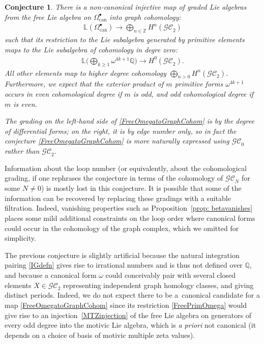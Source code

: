 \documentclass[pdftex]{sigma}%
\newtheorem{conj}[thm]{Conjecture}
{\theoremstyle{definition}
\newtheorem{defn}[thm]{Definition}
\newtheorem{Example}[thm]{Example}
\newtheorem{rem}[thm]{Remark}
}
\numberwithin{equation}{section}
\newcommand{\To}{\longrightarrow}
\newcommand{\Z}{\mathbb Z}
\newcommand{\Q}{\mathbb Q}
\newcommand{\GC}{\mathcal{GC}}
\newcommand{\can}{\mathrm{can}}
\newcommand{\0}{\color{blue}{\mathsf{0}}}
\begin{document}
\begin{conj} \label{conj: Mainconj} There is a non-canonical injective map of graded Lie algebras from the free Lie algebra on $\Omega^{\bullet}_{\can}$ into graph cohomology:
\begin{gather} \label{FreeOmegatoGraphCohom} \mathbb{L} \left( \Omega^{\bullet}_{\can} \right) \To \bigoplus_{n\in \Z} H^{n} (\GC_2)
\end{gather}
such that its restriction to the Lie subalgebra generated by primitive elements
maps to the Lie subalgebra of cohomology in degre zero:
\begin{gather} \label{FreePrimOmega}
\mathbb{L} \bigg(\bigoplus_{k\geq 1}\omega^{4k+1} \Q \bigg) \To H^{0} (\GC_2).
\end{gather}
All other elements map to higher degree cohomology $\bigoplus_{n>0} H^{n} (\GC_2)$.
Furthermore, we expect that the exterior product of $m$ primitive forms $\omega^{4k+1}$ occurs in even cohomological degree if $m$ is odd, and odd cohomological degree if $m$ is even.


The grading on the left-hand side of \eqref{FreeOmegatoGraphCohom} is by the degree of differential forms; on the right, it is by edge number only, so in fact the conjecture \eqref{FreeOmegatoGraphCohom} is more naturally expressed using $\GC_0$ rather than $\GC_2$.
\end{conj}

Information about the loop number (or equivalently, about the cohomological grading, if one rephrases the conjecture in terms of the cohomology of $\GC_N$ for some $N\neq 0$) is mostly lost in this conjecture. It is possible that some of the information can be recovered by replacing these gradings with a suitable filtration. Indeed, vanishing properties such as Proposition~\ref{prop: betavanishes} places some mild additional constraints on the loop order where canonical forms could occur in the cohomology of the graph complex, which we omitted for simplicity.

\begin{rem} The previous conjecture is slightly artificial because the natural integration pairing \eqref{IGdefn} gives rise to irrational numbers and is thus not defined over $\Q$, and because a canonical form $\omega$ could conceivably pair with several closed elements $X \in \GC_2$ representing independent graph homology classes, and giving distinct periods. Indeed, we do not expect there to be a~canonical candidate for a map \eqref{FreeOmegatoGraphCohom} since its restriction \eqref{FreePrimOmega} would give rise to an injection~\eqref{MTZinjection} of the free Lie algebra on generators of every odd degree into the motivic Lie algebra, which is \emph{a priori} not canonical (it depends on a choice of basis of motivic multiple zeta values).
\end{rem}
\end{document}
